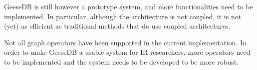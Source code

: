 GeeseDB is still however a prototype system, and more functionalities need to be implemented. In particular, although the architecture is not coupled, it is not (yet) as efficient as traditional methods that do use coupled architectures. 

Not all graph operators have been supported in the current implementation. In order to make GeeseDB a usable system for IR researchers, more operators need to be implemented and the system needs to be developed to be more robust. 
 
